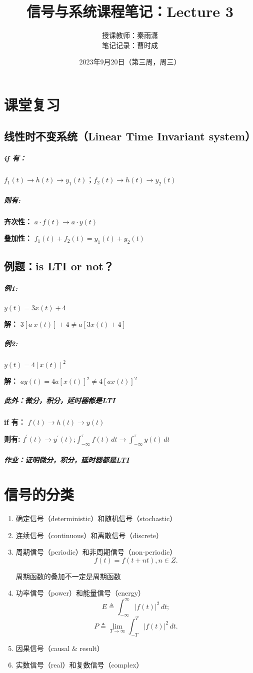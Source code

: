 \documentclass[UTF8]{ctexart}
\title{信号与系统课程笔记：Lecture 3}
\author{授课教师：秦雨潇 \\
笔记记录：曹时成}
\date{2023年9月20日（第三周，周三）}
\begin{document}
\maketitle

\section{课堂复习}
\subsection{线性时不变系统（Linear Time Invariant system）}
\subparagraph{if 有：} \par
$f_1(t)\to h(t)\to y_1(t)$；$f_2(t)\to h(t)\to y_2(t)$ \par
\subparagraph{则有:}
\textbf{齐次性：}
$a\cdot f(t)\to a\cdot y(t)$\par
\textbf{\qquad \; \; 叠加性：}
$f_1(t)+f_2(t)=y_1(t)+y_2(t)$

\subsection{例题：is LTI or not？}
\subparagraph{例1:} 
$y(t)=3x(t)+4$\par
\textbf{解：}
$3[a\ x(t)] +4\neq a[ 3x(t)+4]  $\par
\subparagraph{例2:} 
$y(t)=4[ x(t)] ^2$\par
\textbf{解：}
$ay(t)=4a[x(t) ]^2\neq 4[ ax(t)] ^2   $
\subparagraph{此外：微分，积分，延时器都是LTI \\ }
\textbf{ \;  if 有：} 
$f(t)\to h(t)\to y(t)$\par
\textbf{则有:} 
$f^{'} (t)\to y^{'}(t)$;$\int_{-\infty }^{\tau  } f(t) \,dt \to \int_{-\infty }^{\tau } y(t) \,dt$ \par
\subparagraph{作业：证明微分，积分，延时器都是LTI}

\section{信号的分类}
\begin{enumerate}[itemindent=2em,label=(\arabic*)]
    \item 确定信号（deterministic）和随机信号（stochastic）
    \item 连续信号（continuous）和离散信号（discrete）
    \item 周期信号（periodic）和非周期信号（non-periodic）
    \[ f(t)=f(t+nt),n\in Z. \] \par
    \qquad 周期函数的叠加不一定是周期函数
    \item 功率信号（power）和能量信号（energy）
    \[  E\triangleq \int_{-\infty}^{\infty} | f(t)\vert ^2 \,dt ; \]
    \[  P\triangleq \lim_{T \to \infty}  \int_{-T}^{T} | f(t)\vert ^2 \,dt .\]
    \item 因果信号（causal $\& $ result）
    \item 实数信号（real）和复数信号（complex）
\end{enumerate}
\end{document}
